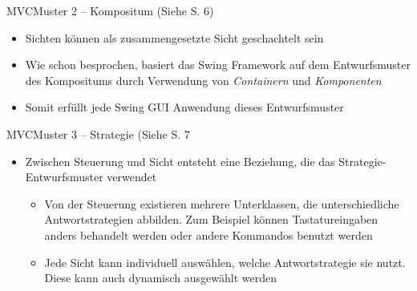 \begin{frame}{MVC}{Muster 2 -- Kompositum (Siehe \cite{judt2017} S. 6)}  
    \begin{itemize}
        \item Sichten können als zusammengesetzte Sicht geschachtelt sein
        \item Wie schon besprochen, basiert das Swing Framework auf dem Entwurfsmuster des Kompositums durch Verwendung von \textit{Containern} und \textit{Komponenten}
        \item Somit erfüllt jede Swing GUI Anwendung dieses Entwurfsmuster
    \end{itemize}
\end{frame}

\begin{frame}{MVC}{Muster 3 -- Strategie (Siehe \cite{judt2017} S. 7}
    \begin{itemize}
        \item Zwischen Steuerung und Sicht entsteht eine Beziehung, die das Strategie-Entwurfsmuster verwendet
        \begin{itemize}
            \item Von der Steuerung existieren mehrere Unterklassen, die unterschiedliche Antwortstrategien abbilden. Zum Beispiel können Tastatureingaben anders behandelt werden oder andere Kommandos benutzt werden
            \item Jede Sicht kann individuell auswählen, welche Antwortstrategie sie nutzt. Diese kann auch dynamisch ausgewählt werden
        \end{itemize}
    \end{itemize}
\end{frame}